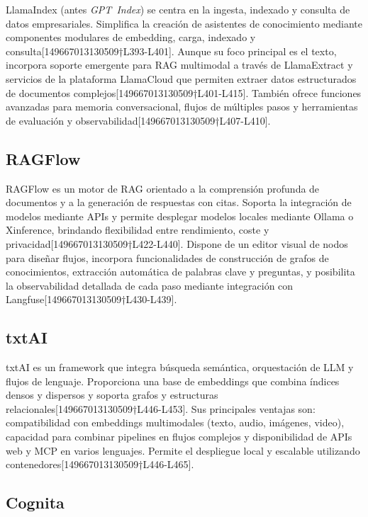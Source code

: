 LlamaIndex (antes \textit{GPT Index}) se centra en la ingesta, indexado y consulta de datos empresariales.  Simplifica la creación de asistentes de conocimiento mediante componentes modulares de embedding, carga, indexado y consulta[149667013130509†L393-L401].  Aunque su foco principal es el texto, incorpora soporte emergente para RAG multimodal a través de LlamaExtract y servicios de la plataforma LlamaCloud que permiten extraer datos estructurados de documentos complejos[149667013130509†L401-L415].  También ofrece funciones avanzadas para memoria conversacional, flujos de múltiples pasos y herramientas de evaluación y observabilidad[149667013130509†L407-L410].

\subsection{RAGFlow}

RAGFlow es un motor de RAG orientado a la comprensión profunda de documentos y a la generación de respuestas con citas.  Soporta la integración de modelos mediante APIs y permite desplegar modelos locales mediante Ollama o Xinference, brindando flexibilidad entre rendimiento, coste y privacidad[149667013130509†L422-L440].  Dispone de un editor visual de nodos para diseñar flujos, incorpora funcionalidades de construcción de grafos de conocimientos, extracción automática de palabras clave y preguntas, y posibilita la observabilidad detallada de cada paso mediante integración con Langfuse[149667013130509†L430-L439].

\subsection{txtAI}

txtAI es un framework que integra búsqueda semántica, orquestación de LLM y flujos de lenguaje.  Proporciona una base de embeddings que combina índices densos y dispersos y soporta grafos y estructuras relacionales[149667013130509†L446-L453].  Sus principales ventajas son: compatibilidad con embeddings multimodales (texto, audio, imágenes, video), capacidad para combinar pipelines en flujos complejos y disponibilidad de APIs web y MCP en varios lenguajes.  Permite el despliegue local y escalable utilizando contenedores[149667013130509†L446-L465].

\subsection{Cognita}

